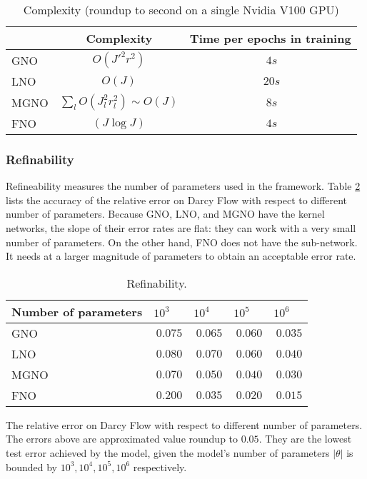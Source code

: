 \begin{table}[h]

\begin{center}
\begin{tabular}{l|cc}
& Complexity
& Time per epochs in training\\
\hline 
GNO        &  $O(J'^2 r^2)$ &  $\ 4s$ \\
LNO       &  $O(J)$ & $\ 20s$ \\
MGNO       &  $\sum_l O(J_l^2 r_l^2)  \sim O(J)$ &  $\ 8s$\\
FNO       & $(J \log J)$  &  $\ 4s$\\
\hline
\end{tabular}
\end{center}
\caption{Complexity (roundup to second on a single Nvidia V100 GPU)}
\label{table:complexity}

\end{table}

\subsubsection{Refinability}
Refineability measures the number of parameters used in the framework. Table \ref{table:refinability} lists the accuracy of the relative error on Darcy Flow with respect to different number of parameters. Because GNO, LNO, and MGNO have the kernel networks, the slope of their error rates are flat: they can work with a very small number of parameters. On the other hand, FNO does not have the sub-network. It needs at a larger magnitude of parameters to obtain an acceptable error rate.

\begin{table}[h]

\begin{center}
\begin{tabular}{l|llll}
Number of parameters
& $10^3$
&$10^4$
&$10^5$ 
& $10^6$\\
\hline 
GNO        & $\ 0.075$  & $\ 0.065$  & $\ 0.060$ & $\ 0.035$ \\
LNO       & $\ 0.080$  & $\ 0.070$  & $\ 0.060$ & $\ 0.040$ \\
MGNO       & $\ 0.070$  & $\ 0.050$  & $\ 0.040$ & $\ 0.030$ \\
FNO      & $\ 0.200$  & $\ 0.035$  & $\ 0.020$ & $\ 0.015$ \\
\hline
\end{tabular}
\caption{Refinability.}
\label{table:refinability}
\small{The relative error on Darcy Flow with respect to different number of parameters. The errors above are approximated value roundup to $0.05$. They are the lowest test error achieved by the model, given the model's number of parameters $|\theta|$ is bounded by $10^3, 10^4, 10^5, 10^6$ respectively.}
\end{center}
\end{table}



